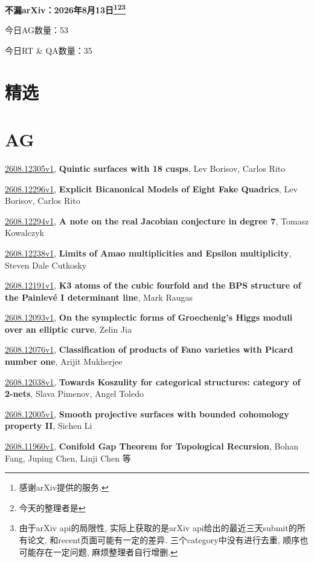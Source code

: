 \documentclass[9pt, a4paper]{article}
\theoremstyle{plain}
\theoremstyle{definition}
\theoremstyle{remark}
\newcommand{\arxiv}[3]{\href{https://arxiv.org/abs/#1}{#1}, \textbf{\textcolor{arxivblue}{#2}}, #3}
\newcommand{\AGnumber}{53}
\newcommand{\RTQAnumber}{35}
\newcommand{\NewestDate}{2026年8月13日}
\newcommand{\todayarXiver}{} %
\begin{document}
\begin{center}
    \Huge\textbf{不漏arXiv：\NewestDate\footnote{感谢arXiv提供的服务.}\footnote{今天的整理者是\todayarXiver}\footnote{由于arXiv api的局限性, 实际上获取的是arXiv api给出的最近三天submit的所有论文, 和recent页面可能有一定的差异. 三个category中没有进行去重, 顺序也可能存在一定问题, 麻烦整理者自行增删.}} \\
\end{center}

\setcounter{section}{-1}

\begin{center}
    今日AG数量：\AGnumber
    
    今日RT \& QA数量：\RTQAnumber
    
\end{center}


\section{精选}


\section{AG}
\arxiv{2608.12305v1}{Quintic surfaces with 18 cusps}{Lev Borisov, Carlos Rito}

\arxiv{2608.12296v1}{Explicit Bicanonical Models of Eight Fake Quadrics}{Lev Borisov, Carlos Rito}

\arxiv{2608.12294v1}{A note on the real Jacobian conjecture in degree 7}{Tomasz Kowalczyk}

\arxiv{2608.12238v1}{Limits of Amao multiplicities and Epsilon multiplicity}{Steven Dale Cutkosky}

\arxiv{2608.12191v1}{K3 atoms of the cubic fourfold and the BPS structure of the Painlevé I determinant line}{Mark Raugas}

\arxiv{2608.12093v1}{On the symplectic forms of Groechenig's Higgs moduli over an elliptic curve}{Zelin Jia}

\arxiv{2608.12076v1}{Classification of products of Fano varieties with Picard number one}{Arijit Mukherjee}

\arxiv{2608.12038v1}{Towards Koszulity for categorical structures: category of 2-nets}{Slava Pimenov, Angel Toledo}

\arxiv{2608.12005v1}{Smooth projective surfaces with bounded cohomology property II}{Sichen Li}

\arxiv{2608.11960v1}{Conifold Gap Theorem for Topological Recursion}{Bohan Fang, Juping Chen, Linji Chen 等}
\end{document}

